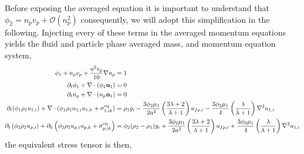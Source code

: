 Before exposing the averaged equation it is important to understand that $\phi_2 = n_p v_p + \mathcal{O}(n_p^2)$ consequently, we will adopt this simplification in the following. 
Injecting every of these terms in the averaged momentum equations yields the fluid and particle phase averaged mass, and momentum equation system, 
\begin{align*}
    \phi_1
    + n_pv_p + \frac{a^2 v_p}{10}\nabla n_p
    &= 1
    \\
    \partial_t \phi_1
    + \mathbf{\nabla}\cdot (
        \phi_1\textbf{u}_1
    )
    &= 
    0\\
    \partial_t n_p
    + \mathbf{\nabla}\cdot (
        n_p\textbf{u}_1
    )
    &= 
    0\\
    \partial_t (\phi_1 \rho_1u_{1,i})  
    + \mathbf{\nabla}\cdot (
        \phi_1 \rho_1u_{1,i}u_{1,k}
        + {\sigma}_{1,ik}^\text{eq}
    )
    &=  \rho_1 g_i 
    -  \frac{3\phi_2\mu_1}{2 a^2} 
    \left(\frac{3\lambda+2}{\lambda+1}\right) u_{f p,i} 
    - \frac{3\phi_2\mu_1}{4} \left(\frac{\lambda}{\lambda+1}\right)\mathbf{\nabla}^2u_{1,i}\\
    \partial_t \left(\phi_2\rho_2 {u}_{p,i}\right)
    + \partial_{k} \left(\phi_2\rho_2 {u}_{p,i} {u}_{p,k} 
    + {\sigma}_{p,ik}^\text{eq}
    \right)
    &= 
    \phi_2(\rho_2 -\rho_1)g_i 
    + \frac{3\phi_2\mu_1}{2 a^2} 
    \left(\frac{3\lambda+2}{\lambda+1}\right) u_{f p,i} 
    + \frac{3\phi_2\mu_1}{4} \left(\frac{\lambda}{\lambda+1}\right)\mathbf{\nabla}^2u_{1,i}
\end{align*}
the equivalent stress tensor is then, 
